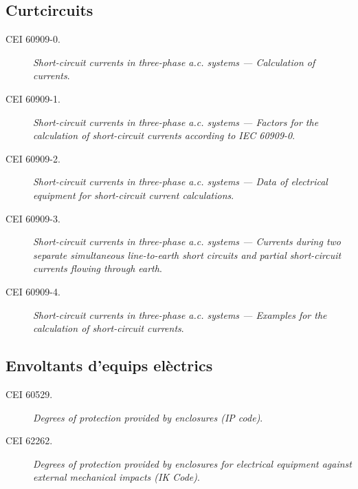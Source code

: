 \subsection*{Curtcircuits}
\begin{description}
    \item [\hspace{5mm}CEI 60909-0.] \textit{Short-circuit currents in three-phase a.c. systems --- Calculation of currents}.
    \item [\hspace{5mm}CEI 60909-1.] \textit{Short-circuit currents in three-phase a.c. systems ---  Factors for the calculation of short-circuit currents according to IEC 60909-0}.
    \item [\hspace{5mm}CEI 60909-2.] \textit{Short-circuit currents in three-phase a.c. systems ---  Data of electrical equipment for short-circuit current calculations}.
    \item [\hspace{5mm}CEI 60909-3.] \textit{Short-circuit currents in three-phase a.c. systems --- Currents during two separate simultaneous line-to-earth short circuits and partial short-circuit currents flowing through earth}.
    \item [\hspace{5mm}CEI 60909-4.] \textit{Short-circuit currents in three-phase a.c. systems --- Examples for the calculation of short-circuit currents}.
\end{description}

\subsection*{Envoltants d'equips elèctrics}
\begin{description}
	\item [\hspace{5mm}CEI 60529.] \textit{Degrees of protection provided by enclosures (IP code)}.
	\item [\hspace{5mm}CEI 62262.] \textit{Degrees of protection provided by enclosures for electrical equipment against external mechanical impacts (IK Code)}.
\end{description}

